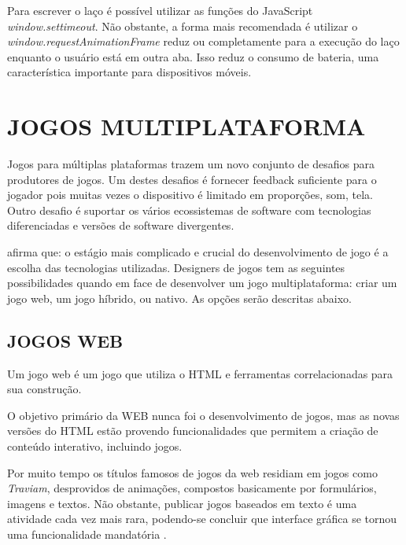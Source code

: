 Para escrever o laço é possível utilizar as funções do JavaScript
\textit{window.settimeout}. Não obstante, a forma mais recomendada é
utilizar o \textit{window.requestAnimationFrame} reduz ou completamente
para a execução do laço enquanto o usuário está em outra aba.
Isso reduz o consumo de bateria, uma característica importante para
dispositivos móveis.

\section{JOGOS MULTIPLATAFORMA}
\begin{draft}
Jogos para múltiplas plataformas trazem um novo conjunto de desafios
para produtores de jogos. Um destes desafios é fornecer feedback
suficiente para o jogador pois muitas vezes o dispositivo é limitado em
proporções, som, tela. Outro desafio é suportar os vários ecossistemas
de software com tecnologias diferenciadas e versões de software
divergentes.


\cite{html5mostwanted} afirma que: o estágio mais complicado e crucial
do desenvolvimento de jogo é a escolha das tecnologias utilizadas.
Designers de jogos tem as seguintes possibilidades quando em face
de desenvolver um jogo multiplataforma: criar um jogo web, um jogo
híbrido, ou nativo. As opções serão descritas abaixo.

\subsection{JOGOS WEB}


Um jogo web é um jogo que utiliza o HTML e ferramentas correlacionadas
para sua construção.

O objetivo primário da WEB nunca foi o desenvolvimento de
jogos, mas as novas versões do HTML estão provendo funcionalidades
que permitem a criação de conteúdo interativo, incluindo jogos.

Por muito tempo os títulos famosos de jogos da web residiam em jogos
como \textit{Traviam}, desprovidos de animações, compostos basicamente
por formulários, imagens e textos. Não obstante, publicar jogos
baseados em texto é uma atividade cada vez mais rara, podendo-se
concluir que interface gráfica se tornou uma funcionalidade mandatória
\autocite{browserGamesTechnologyAndFuture}.


\end{draft}
